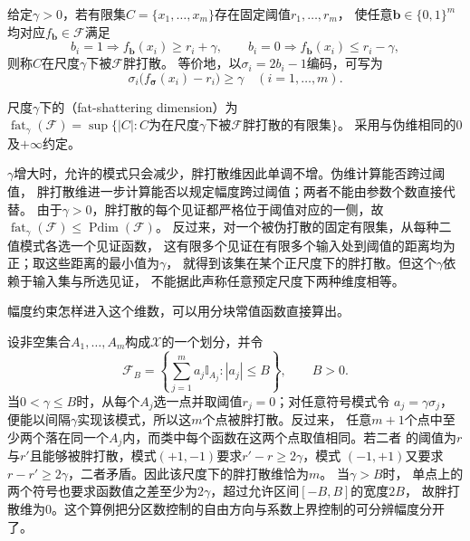 \begin{definition}[胖打散]
\label{def:fat-shattering}
给定$\gamma>0$，若有限集$C=\{x_1,\ldots,x_m\}$存在固定阈值$r_1,\ldots,r_m$，
使任意$\bm b\in\{0,1\}^m$均对应$f_{\bm b}\in\mathcal F$满足
\begin{equation}
 b_i=1\Rightarrow f_{\bm b}(x_i)\geq r_i+\gamma,\qquad
 b_i=0\Rightarrow f_{\bm b}(x_i)\leq r_i-\gamma,
 \label{eq:fat-shattering}
\end{equation}
则称$C$在尺度$\gamma$下被$\mathcal F$胖打散。
等价地，以$\sigma_i=2b_i-1$编码，可写为
\begin{equation}
 \sigma_i\bigl(f_{\bm\sigma}(x_i)-r_i\bigr)\geq\gamma
 \quad(i=1,\ldots,m).
 \label{eq:functional-fat-shattering}
\end{equation}
\end{definition}
\begin{definition}[胖打散维]
\label{def:fat-shattering-dimension}
尺度$\gamma$下的（fat-shattering dimension）为
$\operatorname{fat}_\gamma(\mathcal F)=
\sup\{|C|:C\text{为在尺度}\gamma\text{下被}\mathcal F\text{胖打散的有限集}\}$。
采用与伪维相同的$0$及$+\infty$约定。
\end{definition}

$\gamma$增大时，允许的模式只会减少，胖打散维因此单调不增。伪维计算能否跨过阈值，
胖打散维进一步计算能否以规定幅度跨过阈值；两者不能由参数个数直接代替。
由于$\gamma>0$，胖打散的每个见证都严格位于阈值对应的一侧，故
$\operatorname{fat}_\gamma(\mathcal F)\leq\operatorname{Pdim}(\mathcal F)$。
反过来，对一个被伪打散的固定有限集，从每种二值模式各选一个见证函数，
这有限多个见证在有限多个输入处到阈值的距离均为正；取这些距离的最小值为$\gamma$，
就得到该集在某个正尺度下的胖打散。但这个$\gamma$依赖于输入集与所选见证，
不能据此声称任意预定尺度下两种维度相等。

幅度约束怎样进入这个维数，可以用分块常值函数直接算出。
\begin{example}[分块常值函数的胖打散维]
\label{ex:comb-piecewise-constant-fat-dimension}
设非空集合$A_1,\ldots,A_m$构成$\mathcal{X}$的一个划分，并令
\[
  \mathcal{F}_B
  =
  \left\{
    \sum_{j=1}^{m}a_j\mathbb{I}_{A_j}:
    |a_j|\leq B
  \right\},
  \qquad B>0.
\]
当$0<\gamma\leq B$时，从每个$A_j$选一点并取阈值$r_j=0$；对任意符号模式令
$a_j=\gamma\sigma_j$，便能以间隔$\gamma$实现该模式，所以这$m$个点被胖打散。反过来，
任意$m+1$个点中至少两个落在同一个$A_j$内，而类中每个函数在这两个点取值相同。若二者
的阈值为$r$与$r'$且能够被胖打散，模式$(+1,-1)$要求$r'-r\geq2\gamma$，模式
$(-1,+1)$又要求$r-r'\geq2\gamma$，二者矛盾。因此该尺度下的胖打散维恰为$m$。
当$\gamma>B$时，
单点上的两个符号也要求函数值之差至少为$2\gamma$，超过允许区间$[-B,B]$的宽度$2B$，
故胖打散维为$0$。这个算例把分区数控制的自由方向与系数上界控制的可分辨幅度分开了。
\end{example}

